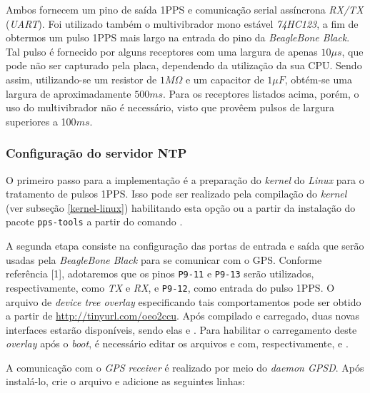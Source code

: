 Ambos fornecem um pino de saída 1PPS e comunicação serial assíncrona
\textit{RX/TX} (\textit{UART}). Foi utilizado também o multivibrador mono
estável \textit{74HC123}, a fim de obtermos um pulso 1PPS mais largo na entrada
do pino da \textit{BeagleBone Black}. Tal pulso é fornecido por alguns
receptores com uma largura de apenas \(10\mu s\), que pode não ser capturado pela placa, dependendo da
utilização da sua CPU. Sendo assim, utilizando-se um resistor de \(1M\Omega\) e
um capacitor de \(1\mu F\), obtém-se uma largura de aproximadamente \(500 ms\).
Para os receptores listados acima, porém, o uso do multivibrador não é
necessário, visto que provêem pulsos de largura superiores a 100\(ms\).

\subsubsection{Configuração do servidor NTP}

O primeiro passo para a implementação é a preparação do \textit{kernel} do
\textit{Linux} para o tratamento de pulsos 1PPS. Isso pode ser realizado pela
compilação do \textit{kernel} (ver subseção \ref{kernel-linux}) habilitando esta
opção ou a partir da instalação do pacote \texttt{pps-tools} a partir do comando
 .

\vspace{12pt}

A segunda etapa consiste na configuração das portas de entrada e
saída que serão usadas pela \textit{BeagleBone Black} para se comunicar com o
GPS. Conforme referência [1], adotaremos que os pinos \texttt{P9-11} e
\texttt{P9-13} serão utilizados, respectivamente, como \textit{TX} e
\textit{RX}, e \texttt{P9-12}, como entrada do pulso 1PPS. O arquivo de
\textit{device tree overlay} especificando tais comportamentos pode ser obtido
a partir de \url{http://tinyurl.com/oeo2ccu}. Após compilado e carregado, duas
novas  interfaces estarão disponíveis, sendo elas  e
. Para habilitar o carregamento deste \textit{overlay} após o
\textit{boot}, é necessário editar os arquivos  e
 com, respectivamente,
 e .

\vspace{12pt}
 
A comunicação com o \textit{GPS receiver} é realizado por meio do
\textit{daemon GPSD}. Após instalá-lo, crie o arquivo
 e adicione as seguintes linhas:

